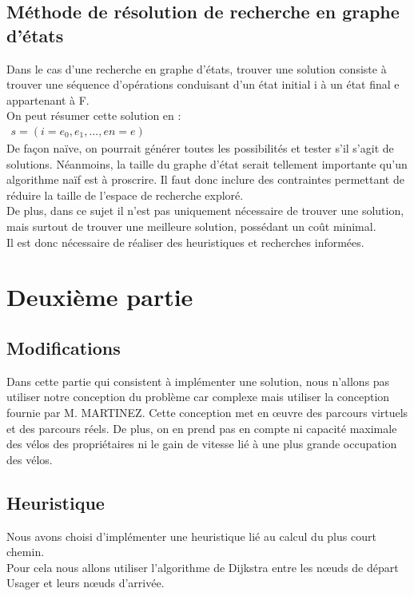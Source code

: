 \documentclass[french]{article}
\begin{document}
\subsection{Méthode de résolution de recherche en graphe d’états}
\noindent
Dans le cas d’une recherche en graphe d’états, trouver une solution consiste à trouver une séquence d’opérations conduisant d’un état initial i à un état final e appartenant à F.\\
On peut résumer cette solution en :\\
$\displaystyle\begin{matrix}
s =(i=e_{0},e_{1}, ... ,e{n}=e)
\end{matrix}$\\
De façon naïve, on pourrait générer toutes les possibilités et tester s’il s’agit de solutions. Néanmoins, la taille du graphe d’état serait tellement importante qu’un algorithme naïf est à proscrire. Il faut donc inclure des contraintes permettant de réduire la taille de l’espace de recherche exploré.\\
De plus, dans ce sujet il n’est pas uniquement nécessaire de trouver une solution, mais surtout de trouver une meilleure solution, possédant un coût minimal.\\
Il est donc nécessaire de réaliser des heuristiques et recherches informées.\\

\section{Deuxième partie}
\subsection{Modifications}
Dans cette partie qui consistent à implémenter une solution, nous n'allons pas utiliser notre conception du problème car complexe mais utiliser la conception fournie par M. MARTINEZ. Cette conception met en œuvre des parcours virtuels et des parcours réels. De plus, on en prend pas en compte ni capacité maximale des vélos des propriétaires ni le gain de vitesse lié à une plus grande occupation des vélos.

\subsection{Heuristique}
Nous avons choisi d'implémenter une heuristique lié au calcul du plus court chemin. \\Pour cela nous allons utiliser l'algorithme de Dijkstra entre les nœuds de départ Usager et leurs nœuds d'arrivée.
\end{document}
